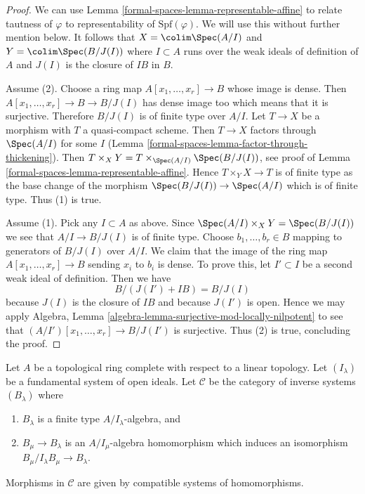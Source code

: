 \begin{proof}
We can use Lemma \ref{formal-spaces-lemma-representable-affine} to relate tautness of
$\varphi$ to representability of $\text{Spf}(\varphi)$. We will use this
without further mention below. It follows that $X = \colim \Spec(A/I)$
and $Y = \colim \Spec(B/J(I))$ where $I \subset A$ runs over the weak
ideals of definition of $A$ and $J(I)$ is the closure of $IB$ in $B$.

\medskip\noindent
Assume (2).
Choose a ring map $A[x_1, \ldots, x_r] \to B$ whose image is dense.
Then $A[x_1, \ldots, x_r] \to B \to B/J(I)$ has dense image too
which means that it is surjective. Therefore $B/J(I)$ is of
finite type over $A/I$. Let $T \to X$ be a morphism with
$T$ a quasi-compact scheme. Then $T \to X$ factors through
$\Spec(A/I)$ for some $I$ (Lemma \ref{formal-spaces-lemma-factor-through-thickening}).
Then $T \times_X Y = T \times_{\Spec(A/I)} \Spec(B/J(I))$, see proof of
Lemma \ref{formal-spaces-lemma-representable-affine}.
Hence $T \times_Y X \to T$ is of finite type as the base change of
the morphism $\Spec(B/J(I)) \to \Spec(A/I)$ which is of finite
type. Thus (1) is true.

\medskip\noindent
Assume (1). Pick any $I \subset A$ as above. Since
$\Spec(A/I) \times_X Y = \Spec(B/J(I))$ we see that $A/I \to B/J(I)$
is of finite type. Choose $b_1, \ldots, b_r \in B$
mapping to generators of $B/J(I)$ over $A/I$. We claim that the image
of the ring map $A[x_1, \ldots, x_r] \to B$ sending $x_i$ to $b_i$
is dense. To prove this, let $I' \subset I$ be a second weak ideal
of definition. Then we have
$$
B/(J(I') + IB) = B/J(I)
$$
because $J(I)$ is the closure of $IB$ and because $J(I')$ is open.
Hence we may apply Algebra, Lemma
\ref{algebra-lemma-surjective-mod-locally-nilpotent}
to see that $(A/I')[x_1, \ldots, x_r] \to B/J(I')$ is surjective.
Thus (2) is true, concluding the proof.
\end{proof}

Let $A$ be a topological ring complete with respect to a linear
topology. Let $(I_\lambda)$ be a fundamental system of open ideals.
Let $\mathcal{C}$ be the category of inverse systems $(B_\lambda)$ where
\begin{enumerate}
\item $B_\lambda$ is a finite type $A/I_\lambda$-algebra, and
\item $B_\mu \to B_\lambda$ is an $A/I_\mu$-algebra homomorphism
which induces an isomorphism $B_\mu/I_\lambda B_\mu \to B_\lambda$.
\end{enumerate}
Morphisms in $\mathcal{C}$ are given by compatible systems of homomorphisms.

